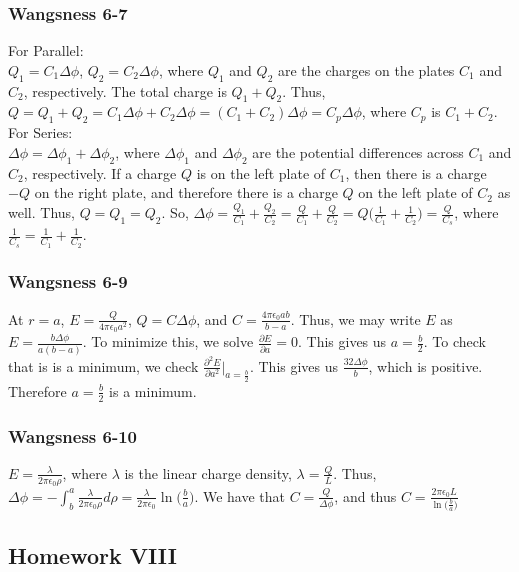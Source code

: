\documentclass{article}
\theoremstyle{mystyle}
\begin{document}
\subsubsection{Wangsness 6-7}
For Parallel:\\
$Q_1 = C_1\Delta \phi$, $Q_2 = C_2\Delta \phi$, where $Q_1$ and $Q_2$ are the charges on the plates $C_1$ and $C_2$, respectively. The total charge is $Q_1+Q_2$. Thus, $Q=Q_1+Q_2 = C_1\Delta\phi + C_2 \Delta \phi =(C_1+C_2)\Delta\phi = C_p \Delta \phi$, where $C_p$ is $C_1+C_2$. \\
For Series:\\
$\Delta \phi = \Delta\phi_1 + \Delta \phi_2$, where $\Delta\phi_1$ and $\Delta \phi_2$ are the potential differences across $C_1$ and $C_2$, respectively. If a charge $Q$ is on the left plate of $C_1$, then there is a charge $-Q$ on the right plate, and therefore there is a charge $Q$ on the left plate of $C_2$ as well. Thus, $Q=Q_1=Q_2$. So, $\Delta \phi = \frac{Q_1}{C_1} + \frac{Q_2}{C_2} = \frac{Q}{C_1}+\frac{Q}{C_2} = Q\big(\frac{1}{C_1}+\frac{1}{C_2}\big) = \frac{Q}{C_s}$, where $\frac{1}{C_s} = \frac{1}{C_1}+\frac{1}{C_2}$.
\subsubsection{Wangsness 6-9}
At $r=a$, $E=\frac{Q}{4\pi \epsilon_0 a^2}$, $Q=C\Delta \phi$, and $C=\frac{4\pi \epsilon_0 ab}{b-a}$. Thus, we may write $E$ as $E=\frac{b\Delta \phi}{a(b-a)}$. To minimize this, we solve $\frac{\partial E}{\partial a} = 0$. This gives us $a=\frac{b}{2}$. To check that is is a minimum, we check $\frac{\partial^2 E}{\partial a^2}\bigg|_{a=\frac{b}{2}}$. This gives us $\frac{32\Delta \phi}{b}$, which is positive. Therefore $a=\frac{b}{2}$ is a minimum.
\subsubsection{Wangsness 6-10}
$E=\frac{\lambda}{2\pi \epsilon_0 \rho}$, where $\lambda$ is the linear charge density, $\lambda = \frac{Q}{L}$. Thus, $\Delta\phi = - \int_{b}^{a} \frac{\lambda}{2\pi \epsilon_0\rho}d\rho = \frac{\lambda}{2\pi \epsilon_0}\ln\big(\frac{b}{a}\big)$. We have that $C=\frac{Q}{\Delta\phi}$, and thus $C = \frac{2\pi \epsilon_0 L}{\ln\big(\frac{b}{a}\big)}$
\subsection{Homework VIII}
\end{document}
